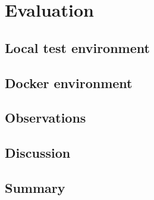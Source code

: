 \chapter{Evaluation}
%

\section{Local test environment}

\section{Docker environment}

\section{Observations}

\section{Discussion}

\section{Summary}

